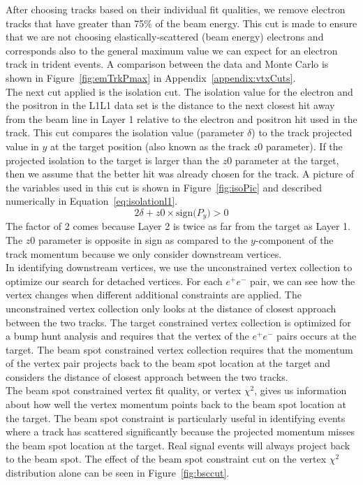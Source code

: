 \indent After choosing tracks based on their individual fit qualities, we remove electron tracks that have greater than 75$\%$ of the beam energy. This cut is made to ensure that we are not choosing elastically-scattered (beam energy) electrons and corresponds also to the general maximum value we can expect for an electron track in trident events. A comparison between the data and Monte Carlo is shown in Figure~\ref{fig:emTrkPmax} in Appendix~\ref{appendix:vtxCuts}. \\
\indent The next cut applied is the isolation cut. The isolation value for the electron and the positron in the L1L1 data set is the distance to the next closest hit away from the beam line in Layer 1 relative to the electron and positron hit used in the track. This cut compares the isolation value (parameter $\delta$) to the track projected value in $y$ at the target position (also known as the track $z0$ parameter). If the projected isolation to the target is larger than the $z0$ parameter at the target, then we assume that the better hit was already chosen for the track. A picture of the variables used in this cut is shown in Figure~\ref{fig:isoPic} and described numerically in Equation~\eqref{eq:isolationl1}.
\begin{equation}
\label{eq:isolationl1}
2\delta+z0\times\textrm{sign($P_y$)}>0
\end{equation}
The factor of 2 comes because Layer 2 is twice as far from the target as Layer 1. The $z0$ parameter is opposite in sign as compared to the $y$-component of the track momentum because we only consider downstream vertices. \\
\indent In identifying downstream vertices, we use the unconstrained vertex collection to optimize our search for detached vertices. For each $e^+e^-$ pair, we can see how the vertex changes when different additional constraints are applied. The unconstrained vertex collection only looks at the distance of closest approach between the two tracks. The target constrained vertex collection is optimized for a bump hunt analysis and requires that the vertex of the $e^+e^-$ pairs occurs at the target. The beam spot constrained vertex collection requires that the momentum of the vertex pair projects back to the beam spot location at the target and considers the distance of closest approach between the two tracks.\\ 
\indent The beam spot constrained vertex fit quality, or vertex $\chi^2$, gives us information about how well the vertex momentum points back to the beam spot location at the target. The beam spot constraint is particularly useful in identifying events where a track has scattered significantly because the projected momentum misses the beam spot location at the target. Real signal events will always project back to the beam spot. The effect of the beam spot constraint cut on the vertex  $\chi^2$ distribution alone can be seen in Figure~\ref{fig:bsccut}.
